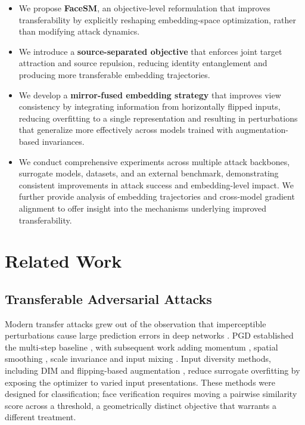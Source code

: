 \documentclass[a4paper,fleqn]{cas-dc}
\begin{document}
\begin{itemize}
\item We propose \textbf{FaceSM}, an objective-level reformulation that improves transferability by explicitly reshaping embedding-space optimization, rather than modifying attack dynamics.
\item We introduce a \textbf{source-separated objective} that enforces joint target attraction and source repulsion, reducing identity entanglement and producing more transferable embedding trajectories.
\item We develop a \textbf{mirror-fused embedding strategy} that improves view consistency by integrating information from horizontally flipped inputs, reducing overfitting to a single representation and resulting in perturbations that generalize more effectively across models trained with augmentation-based invariances.
\item We conduct comprehensive experiments across multiple attack backbones, surrogate models, datasets, and an external benchmark, demonstrating consistent improvements in attack success and embedding-level impact. We further provide analysis of embedding trajectories and cross-model gradient alignment to offer insight into the mechanisms underlying improved transferability.
\end{itemize}

\section{Related Work}
\subsection{Transferable Adversarial Attacks}

Modern transfer attacks grew out of the observation that imperceptible perturbations cause large prediction errors in deep networks \citet{goodfellow2015explaining}. PGD established the multi-step baseline \citet{madry2018towards}, with subsequent work adding momentum \citet{dong2018boosting}, spatial smoothing \citet{dong2019evading}, scale invariance \citet{lin2020nesterov} and input mixing \citet{wang2021admix}. Input diversity methods, including DIM \citet{xie2019improving} and flipping-based augmentation \citet{fang2023improving}, reduce surrogate overfitting by exposing the optimizer to varied input presentations. These methods were designed for classification; face verification requires moving a pairwise similarity score across a threshold, a geometrically distinct objective that warrants a different treatment.
\end{document}

